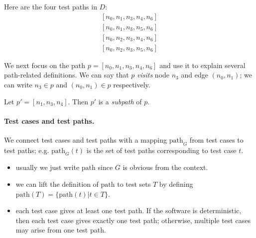\documentclass[11pt]{article}
\begin{document}
\begin{center}
\label{D}
\end{center}
Here are the four test paths in $D$:
\begin{eqnarray*}
&[n_0, n_1, n_3, n_4, n_6]& \\
&[n_0, n_1, n_3, n_5, n_6]& \\
&[n_0, n_2, n_3, n_4, n_6]& \\
&[n_0, n_2, n_3, n_5, n_6]&
\end{eqnarray*}

We next focus on the path $p = [n_0, n_1, n_3, n_4, n_6]$ and use it
to explain several path-related definitions. We can say that $p$
\emph{visits} node $n_3$ and edge $(n_0, n_1)$; we can write $n_3 \in
p$ and $(n_0, n_1) \in p$ respectively. 

Let $p' = [n_1, n_3, n_4]$. Then $p'$ is a \emph{subpath} of $p$.

\paragraph{Test cases and test paths.} We connect test cases and
test paths with a mapping $\mbox{path}_G$ from test cases to test
paths; e.g. $\mbox{path}_G(t)$ is the set of test paths corresponding
to test case $t$.
\begin{itemize}
\item usually we just write $\mbox{path}$ since $G$ is obvious from the context.
\item we can lift the definition of $\mbox{path}$ to test sets $T$ by defining
$\mbox{path}(T) = \{ \mbox{path}(t) | t \in T \}$.
\item each test case gives at least one test path. If the software is
  deterministic, then each test case gives exactly one test path;
  otherwise, multiple test cases may arise from one test path.
\end{itemize}
\end{document}
